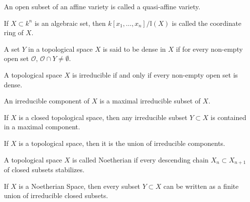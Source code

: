                 \begin{definition}
                    An open subset of an affine variety
                    is called a quasi-affine variety.
                \end{definition}
                \begin{definition}
                    If $X\subset k^n$ is an algebraic set,
                    then $k[x_1,\hdots ,x_n]/\mathbb{I}(X)$
                    is called the coordinate ring of $X$.
                \end{definition}
                \begin{definition}
                    A set $Y$ in a topological space $X$ is
                    said to be dense in $X$ if for every
                    non-empty open set $\mathcal{O}$,
                    $\mathcal{O}\cap Y\ne \emptyset$.
                \end{definition}
                \begin{theorem}
                    A topological space $X$ is irreducible if
                    and only if every non-empty open set is dense.
                \end{theorem}
                \begin{definition}
                    An irreducible component of $X$ is a
                    maximal irreducible subset of $X$.
                \end{definition}
                \begin{theorem}
                    If $X$ is a closed topological space,
                    then any irreducible subset $Y\subset X$ is
                    contained in a maximal component.
                \end{theorem}
                \begin{theorem}
                    If $X$ is a topological space,
                    then it is the union of irreducible components.
                \end{theorem}
                \begin{definition}
                    A topological space $X$ is called Noetherian
                    if every descending chain $X_n \subset X_{n+1}$
                    of closed subsets stabilizes.
                \end{definition}
                \begin{theorem}
                    If $X$ is a Noetherian Space,
                    then every subset $Y\subset X$ can be
                    written as a finite union of irreducible
                    closed subsets.
                \end{theorem}
